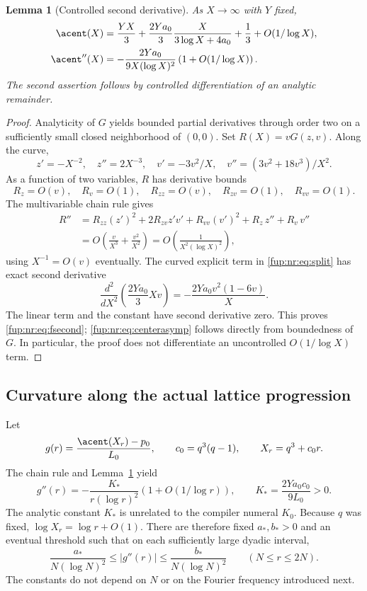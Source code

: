 \documentclass[11pt,letterpaper]{article}
\newtheorem{lemma}[theorem]{Lemma}
\theoremstyle{definition}\newtheorem{definition}[theorem]{Definition}
\theoremstyle{remark}\newtheorem{remark}[theorem]{Remark}
\begin{document}
\begin{lemma}[Controlled second derivative]\label{fup:nr:lem:curvature}
As $X\to\infty$ with $Y$ fixed,
\begin{align}\label{fup:nr:eq:centerasymp}
 \acent(X)&=\frac{YX}3+\frac{2Ya_0}3\frac{X}{3\log X+4a_0}
                  +\frac13+O(1/\log X),\\
 \acent''(X)&=-\frac{2Ya_0}{9X(\log X)^2}
                  \left(1+O(1/\log X)\right).\label{fup:nr:eq:fsecond}
\end{align}
The second assertion follows by controlled differentiation of an analytic remainder.
\end{lemma}
\begin{proof}
Analyticity of $G$ yields bounded partial derivatives through order two on a sufficiently small closed neighborhood of $(0,0)$. Set $R(X)=vG(z,v)$. Along the curve,
\[
 z'=-X^{-2},\quad z''=2X^{-3},\quad
 v'=-3v^2/X,\quad v''=(3v^2+18v^3)/X^2.
\]
As a function of two variables, $R$ has derivative bounds
\[
 R_z=O(v),\quad R_v=O(1),\quad R_{zz}=O(v),\quad
 R_{zv}=O(1),\quad R_{vv}=O(1).
\]
The multivariable chain rule gives
\begin{align*}
 R''&=R_{zz}(z')^2+2R_{zv}z'v'+R_{vv}(v')^2+R_z\,z''+R_v\,v''\\
     &=O\!\left(\frac v{X^3}+\frac{v^2}{X^2}\right)
      =O\!\left(\frac1{X^2(\log X)^2}\right),
\end{align*}
using $X^{-1}=O(v)$ eventually. The curved explicit term in \eqref{fup:nr:eq:split} has exact second derivative
\[
 \frac{d^2}{dX^2}\left(\frac{2Ya_0}3Xv\right)
 =-\frac{2Ya_0v^2(1-6v)}X.
\]
The linear term and the constant have second derivative zero. This proves \eqref{fup:nr:eq:fsecond}; \eqref{fup:nr:eq:centerasymp} follows directly from boundedness of $G$. In particular, the proof does not differentiate an uncontrolled $O(1/\log X)$ term.
\end{proof}

\subsection{Curvature along the actual lattice progression}
Let
\begin{equation}\label{fup:nr:eq:g}
 g(r)=\frac{\acent(X_r)-p_0}{L_0},\qquad
 c_0=q^3(q-1),\qquad X_r=q^3+c_0r.
\end{equation}
The chain rule and Lemma~\ref{fup:nr:lem:curvature} yield
\begin{equation}\label{fup:nr:eq:gsecond}
 g''(r)=-\frac{K_*}{r(\log r)^2}
        \left(1+O(1/\log r)\right),\qquad
 K_* =\frac{2Ya_0c_0}{9L_0}>0.
\end{equation}
The analytic constant $K_*$ is unrelated to the compiler numeral $K_0$. Because $q$ was fixed, $\log X_r=\log r+O(1)$. There are therefore fixed $a_*,b_*>0$ and an eventual threshold such that on each sufficiently large dyadic interval,
\begin{equation}\label{fup:nr:eq:dyadicderivative}
 \frac{a_*}{N(\log N)^2}\le |g''(r)|\le
 \frac{b_*}{N(\log N)^2}\qquad (N\le r\le2N).
\end{equation}
The constants do not depend on $N$ or on the Fourier frequency introduced next.
\end{document}
